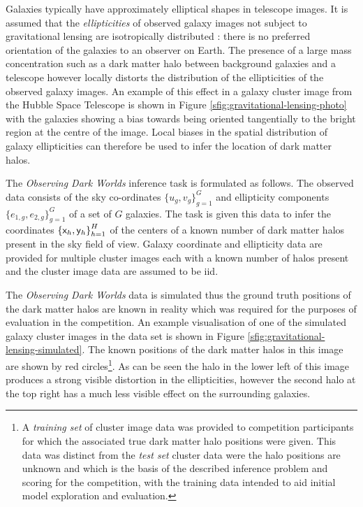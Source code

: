 Galaxies typically have approximately elliptical shapes in telescope images. It is assumed that the \emph{ellipticities} of observed galaxy images not subject to gravitational lensing are isotropically distributed \citep{bartelmann2001weak}: there is no preferred orientation of the galaxies to an observer on Earth. The presence of a large mass concentration such as a dark matter halo between background galaxies and a telescope however locally distorts the distribution of the ellipticities of the observed galaxy images. An example of this effect in a galaxy cluster image from the Hubble Space Telescope is shown in Figure \ref{sfig:gravitational-lensing-photo} with the galaxies showing a bias towards being oriented tangentially to the bright region at the centre of the image. Local biases in the spatial distribution of galaxy ellipticities can therefore be used to infer the location of dark matter halos.

The \emph{Observing Dark Worlds} inference task is formulated as follows. The observed data consists of the sky co-ordinates $\lbrace u_g, v_g \rbrace_{g=1}^G$ and ellipticity components $\lbrace e_{1,g}, e_{2,g} \rbrace_{g=1}^G$ of a set of $G$ galaxies. The task is given this data to infer the coordinates $\lbr \rvar{x}_h, \rvar{y}_h\rbr_{h=1}^H$ of the centers of a known number of dark matter halos present in the sky field of view. Galaxy coordinate and ellipticity data are provided for multiple cluster images each with a known number of halos present and the cluster image data are assumed to be \ac{iid}.

The \emph{Observing Dark Worlds} data is simulated thus the ground truth positions of the dark matter halos are known in reality which was required for the purposes of evaluation in the competition. An example visualisation of one of the simulated galaxy cluster images in the data set is shown in Figure \ref{sfig:gravitational-lensing-simulated}. The known positions of the dark matter halos in this image are shown by red circles\footnote{A \emph{training set} of cluster image data was provided to competition participants for which the associated true dark matter halo positions were given. This data was distinct from the \emph{test set} cluster data were the halo positions are unknown and which is the basis of the described inference problem and scoring for the competition, with the training data intended to aid initial model exploration and evaluation.}. As can be seen the halo in the lower left of this image produces a strong visible distortion in the ellipticities, however the second halo at the top right has a much less visible effect on the surrounding galaxies. %

